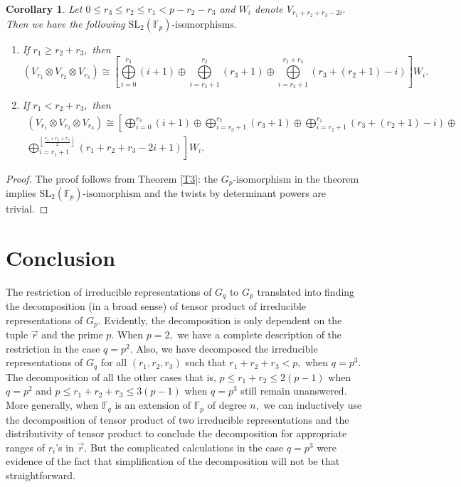 \documentclass[10pt, reqno]{amsart}
\def\F{{\mathbb F}}
\def\Gq{{G_q}}
\def\Gp{{G_p}}
\numberwithin{equation}{section}
\newtheorem{corollary}[theorem]{Corollary}%
\theoremstyle{remark}
\begin{document}
	\begin{corollary}
		Let $0\leq r_3\leq r_2\leq r_1<p-r_2-r_3$ and $W_i$ denote $V_{r_1+r_2+r_3-2i}.$ Then we have the following $\mathrm{SL}_2(\F_p)\text{-isomorphisms}.$
\begin{enumerate}
			\item If $r_1\geq r_2+r_3,$ then
			\begin{equation*}
			    \displaystyle{\left(V_{r_1}\otimes V_{r_2}\otimes V_{r_3}\right)\cong
				\left[\bigoplus\limits_{i=0}^{r_3}(i+1)\oplus\bigoplus\limits_{i=r_3+1}^{r_2}(r_3+1)\oplus\bigoplus\limits_{i=r_2+1}^{r_2+r_3}(r_3+(r_2+1)-i)\right]W_i.}\end{equation*}
               
			
			\item If $r_1< r_2+r_3,$ then			
            \begin{multline*}
            \left(V_{r_1}\otimes V_{r_2}\otimes V_{r_3}\right)\cong
			\displaystyle{\left[\bigoplus\limits_{i=0}^{r_3}(i+1)\oplus\bigoplus\limits_{i=r_3+1}^{r_2}(r_3+1)\oplus\bigoplus\limits_{i=r_2+1}^{r_1}(r_3+(r_2+1)-i)\oplus\right.}\\
\displaystyle{\left.\bigoplus\limits_{i=r_1+1}^{\left\lfloor\frac{r_1+r_2+r_3}{2}\right\rfloor}(r_1+r_2+r_3-2i+1)\right]W_i.}
			    \end{multline*}
			
		\end{enumerate}
	\end{corollary}
	
	\begin{proof}
		The proof follows from Theorem \ref{T3}: the $\Gp\text{-isomorphism}$ in the theorem implies $\text{SL}_2(\F_p)\text{-isomorphism}$ and the twists by determinant powers are trivial.
	\end{proof}
	
	\section{Conclusion}
	The restriction of irreducible representations of $\Gq$ to $\Gp$ translated into finding the decomposition (in a broad sense) of tensor product of irreducible representations of $\Gp.$ Evidently, the decomposition is only dependent on the tuple $\Vec{r}$ and the prime $p.$ When $p=2,$ we have a complete description of the restriction in the case $q=p^2.$ Also, we have decomposed the irreducible representations of $\Gq$ for all $(r_1,r_2,r_3)$ such that $r_1+r_2+r_3<p,$ when $q=p^3.$ The decomposition of all the other cases that is, $p\leq r_1+r_2\leq 2(p-1)$ when $q=p^2$ and $p\leq r_1+r_2+r_3\leq 3(p-1)$ when $q=p^3$ still remain unanswered. More generally, when $\F_q$ is an extension of $\F_p$ of degree $n,$ we can inductively use the decomposition of tensor product of two irreducible representations and the distributivity of tensor product to conclude the decomposition for appropriate ranges of $r_i$'s in $\Vec{r}.$ But the complicated calculations in the case $q=p^3$ were evidence of the fact that simplification of the decomposition will not be that straightforward.
	
\end{document}
